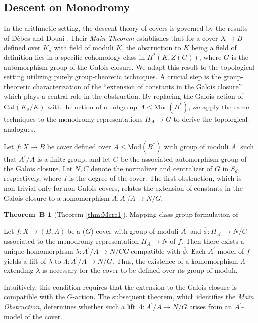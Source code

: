 \documentclass[10pt]{amsart}
\theoremstyle{definition}
\newtheorem*{thmB}{Theorem~B}
\newcommand{\Gal}{{ \mathrm{Gal}}}
\begin{document}
\subsection*{Descent on Monodromy}
In the arithmetic setting, the descent theory of covers is governed by the results of Dèbes and Douai \cite{DebesDouai97}. Their \textit{Main Theorem} establishes that for a cover $X \to B$ defined over $K_s$ with field of moduli $K$, the obstruction to $K$ being a field of definition lies in a specific cohomology class in $H^2(K, Z(G))$, where $G$ is the automorphism group of the Galois closure. We adapt this result to the topological setting utilizing purely group-theoretic techniques. A crucial step is the group-theoretic characterization of the ``extension of constants in the Galois closure'' which plays a central role in the obstruction. By replacing the Galois action of $\Gal(K_s/K)$ with the action of a subgroup $A \leq \mathrm{Mod}(B^*)$, we apply the same techniques to the monodromy representations $\Pi_A \to G$ to derive the topological analogues. 

Let $f\colon X\rightarrow B$ be cover defined over $A\leq \mathrm{Mod}(B^*)$ with group of moduli $A^\prime$ such that $A^\prime/A$ is a finite group, and let $G$ be the associated automorphism group of the Galois closure. Let $N,C$ denote the normalizer and centralizer of $G$ in $S_d$, respectively, where $d$ is the degree of the cover.
The first obstruction, which is non-trivial only for non-Galois covers, relates the extension of constants in the Galois closure to a homomorphism $\Lambda \colon A^\prime/A\rightarrow N/G$.

\begin{thmB}[Theorem \ref{thm:Mere1}] Mapping class group formulation of \cite[\textit{Main Theorem} (I)]{DebesDouai97}

Let $f \colon X \to (B,A)$ be a ($G$)-cover with group of moduli $A^\prime$ and $\overline{\phi}\colon \Pi_{A^\prime} \to N/C $ associated to the monodromy representation $\Pi_A\rightarrow N$ of $f$. Then there exists a unique homomorphism $\lambda \colon A^\prime/A \to N/CG$ compatible with $\overline{\phi}$. Each $A^\prime$-model of $f$ yields a lift of $\lambda$ to $\Lambda\colon A^\prime/A\rightarrow N/G$. Thus, the existence of a homomorphism $\Lambda$ extending $\lambda$ is necessary for the cover to be defined over its group of moduli.
\end{thmB}

Intuitively, this condition requires that the extension to the Galois closure is compatible with the $G$-action. The subsequent theorem, which identifies the \textit{Main Obstruction}, determines whether such a lift $\Lambda\colon A^\prime/A\rightarrow N/G$  arises from an $A^\prime$-model of the cover.
\end{document}
